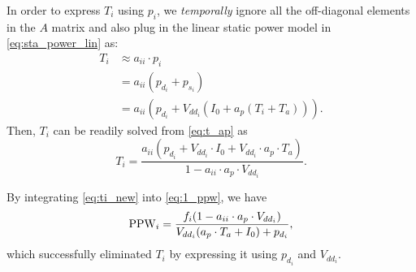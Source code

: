 In order to express $T_i$ using $p_i$, we \emph{temporally} ignore all
the off-diagonal elements in the $A$ matrix and also plug in the
linear static power model in \eqref{eq:sta_power_lin} as:
\begin{equation}\label{eq:t_ap}
\begin{split}
T_{i}&\approx a_{ii} \cdot p_{i}\\
&=a_{ii}(p_{d_i}+p_{s_i})\\
&=a_{ii}(p_{d_i}+V_{dd_i}(I_{0}+a_{p}(T_{i}+T_{a}))).
\end{split}
\end{equation}
Then, $T_i$ can be readily solved from \eqref{eq:t_ap} as
\begin{equation}\label{eq:ti_new}
T_{i}=\frac{a_{ii}(p_{d_i}+V_{dd_i}\cdot I_{0}+V_{dd_i}\cdot a_{p}\cdot T_{a})}{1-a_{ii} \cdot a_{p} \cdot V_{dd_i}}.
\end{equation}

By integrating \eqref{eq:ti_new} into \eqref{eq:1_ppw}, we have
\begin{equation}\label{eq:1_ppw_2}
\ppw_i = \frac{ f_i (1-a_{ii} \cdot a_{p} \cdot V_{dd_i})}{V_{dd_i}(a_{p}\cdot T_{a}+I_{0})+p_{d_i}},
\end{equation}
which successfully eliminated $T_i$ by expressing it using $p_{d_i}$ and $V_{dd_i}$.





